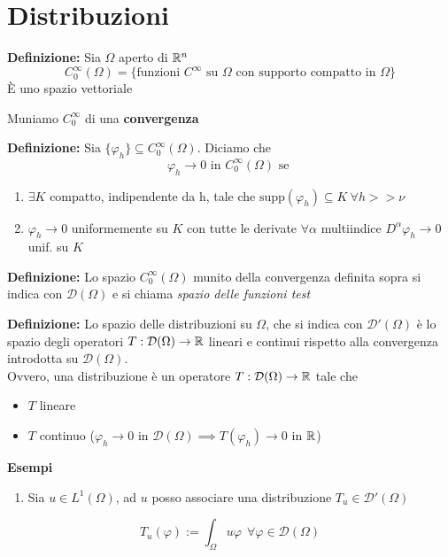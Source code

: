 
\section{Distribuzioni}
\begin{tcolorbox}
\textbf{Definizione: }Sia $\Omega$ aperto di $\mathbb{R}^n$ 
\[C_0^\infty(\Omega)=\{\text{funzioni }C^\infty\text{ su }\Omega\text{ con supporto compatto in }\Omega\}\]
È uno spazio vettoriale
\end{tcolorbox}
Muniamo $C_0^\infty$ di una \textbf{convergenza} 
\begin{tcolorbox}
	\textbf{Definizione: }Sia $\{\varphi_h\} \subseteq  C_0^\infty(\Omega)$. Diciamo che 
	\[\varphi_h\to 0\text{ in }C_0^\infty(\Omega)\text{ se }\]
\begin{enumerate}
	\item $\exists K$ compatto, indipendente da h, tale che $\text{supp}(\varphi_h)\subseteq  K\ \forall h> >\nu$
	\item $\varphi_h\to 0$ uniformemente su $K$ con tutte le derivate $\forall \alpha$ multiindice $D^\alpha\varphi_h\to 0$ unif. su $K$
\end{enumerate}
\end{tcolorbox}
\begin{tcolorbox}
	\textbf{Definizione: }Lo spazio $C_0^\infty(\Omega)$ munito della convergenza definita sopra si indica con $\mathcal D(\Omega)$ e si chiama \emph{spazio delle funzioni test}
\end{tcolorbox}
\begin{tcolorbox}
	\textbf{Definizione: }Lo spazio delle distribuzioni su $\Omega $, che si indica con $\mathcal D'(\Omega)$ è lo spazio degli operatori $T:\mathcal D(\Omega)\to \mathbb{R}$ lineari e continui rispetto alla convergenza introdotta su $\mathcal D(\Omega)$.\\Ovvero, una distribuzione è un operatore $T:\mathcal D(\Omega)\to \mathbb{R}$ tale che 
	\begin{itemize}
		\item $T$ lineare
		\item $T$ continuo ($\varphi_h\to 0$ in $\mathcal D(\Omega)\implies T(\varphi_h)\to 0$ in $\mathbb{R}$)
	\end{itemize}
\end{tcolorbox}
\textbf{Esempi} 
\begin{enumerate}
	\item Sia $u\in L^{1}(\Omega)$, ad $u$ posso associare una distribuzione $T_u\in \mathcal D'(\Omega)$
\end{enumerate}
\[T_u(\varphi):=\int_{\Omega}^{} u\varphi\ \ \forall \varphi\in \mathcal D(\Omega)\]
